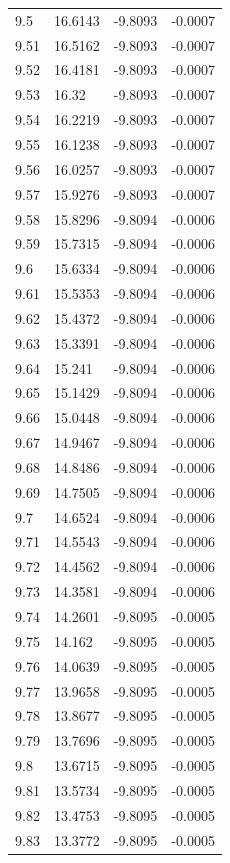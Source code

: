 \begin{tabular}{llll}
9.5 & 16.6143 & -9.8093 & -0.0007 \\
9.51 & 16.5162 & -9.8093 & -0.0007 \\
9.52 & 16.4181 & -9.8093 & -0.0007 \\
9.53 & 16.32 & -9.8093 & -0.0007 \\
9.54 & 16.2219 & -9.8093 & -0.0007 \\
9.55 & 16.1238 & -9.8093 & -0.0007 \\
9.56 & 16.0257 & -9.8093 & -0.0007 \\
9.57 & 15.9276 & -9.8093 & -0.0007 \\
9.58 & 15.8296 & -9.8094 & -0.0006 \\
9.59 & 15.7315 & -9.8094 & -0.0006 \\
9.6 & 15.6334 & -9.8094 & -0.0006 \\
9.61 & 15.5353 & -9.8094 & -0.0006 \\
9.62 & 15.4372 & -9.8094 & -0.0006 \\
9.63 & 15.3391 & -9.8094 & -0.0006 \\
9.64 & 15.241 & -9.8094 & -0.0006 \\
9.65 & 15.1429 & -9.8094 & -0.0006 \\
9.66 & 15.0448 & -9.8094 & -0.0006 \\
9.67 & 14.9467 & -9.8094 & -0.0006 \\
9.68 & 14.8486 & -9.8094 & -0.0006 \\
9.69 & 14.7505 & -9.8094 & -0.0006 \\
9.7 & 14.6524 & -9.8094 & -0.0006 \\
9.71 & 14.5543 & -9.8094 & -0.0006 \\
9.72 & 14.4562 & -9.8094 & -0.0006 \\
9.73 & 14.3581 & -9.8094 & -0.0006 \\
9.74 & 14.2601 & -9.8095 & -0.0005 \\
9.75 & 14.162 & -9.8095 & -0.0005 \\
9.76 & 14.0639 & -9.8095 & -0.0005 \\
9.77 & 13.9658 & -9.8095 & -0.0005 \\
9.78 & 13.8677 & -9.8095 & -0.0005 \\
9.79 & 13.7696 & -9.8095 & -0.0005 \\
9.8 & 13.6715 & -9.8095 & -0.0005 \\
9.81 & 13.5734 & -9.8095 & -0.0005 \\
9.82 & 13.4753 & -9.8095 & -0.0005 \\
9.83 & 13.3772 & -9.8095 & -0.0005 \\

\end{tabular}
